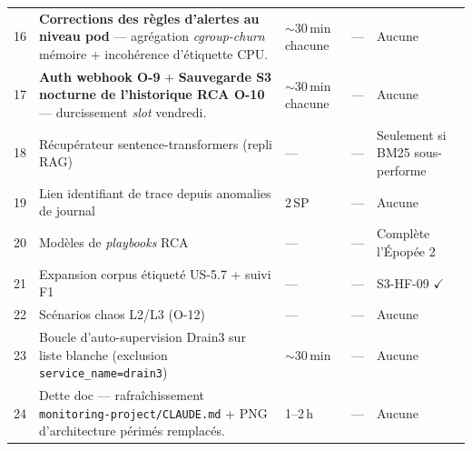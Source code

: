 \documentclass[11pt,a4paper,oneside]{report}
\begin{document}
\begin{longtable}{rp{} p{} p{} p{}}
16 & \textbf{Corrections des règles d'alertes au niveau pod} ---
     agrégation \emph{cgroup-churn} mémoire + incohérence
     d'étiquette CPU.
                                              & $\sim$30\,min chacune
                                              & ---
                                              & Aucune \\
17 & \textbf{Auth webhook O-9} + \textbf{Sauvegarde S3 nocturne de
     l'historique RCA O-10} --- durcissement \emph{slot} vendredi.
                                              & $\sim$30\,min chacune
                                              & ---
                                              & Aucune \\
18 & Récupérateur sentence-transformers (repli RAG) & ---
                                              & ---
                                              & Seulement si BM25 sous-performe \\
19 & Lien identifiant de trace depuis anomalies de journal & 2\,SP
                                              & ---
                                              & Aucune \\
20 & Modèles de \emph{playbooks} RCA                   & ---
                                              & ---
                                              & Complète l'Épopée 2 \\
21 & Expansion corpus étiqueté US-5.7 + suivi F1
                                              & ---
                                              & ---
                                              & S3-HF-09 $\checkmark$ \\
22 & Scénarios chaos L2/L3 (O-12)             & ---
                                              & ---
                                              & Aucune \\
23 & Boucle d'auto-supervision Drain3 sur liste blanche
     (exclusion \texttt{service\_name=drain3})
                                              & $\sim$30\,min
                                              & ---
                                              & Aucune \\
24 & Dette doc --- rafraîchissement
     \texttt{monitoring-project/CLAUDE.md} + PNG d'architecture
     périmés remplacés.
                                              & 1--2\,h
                                              & ---
                                              & Aucune \\
\end{longtable}
\end{document}

